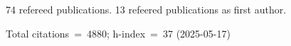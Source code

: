 74 refereed publications. 13 refeered publications as first author.

Total citations~=~4880; h-index~=~37 (2025-05-17)